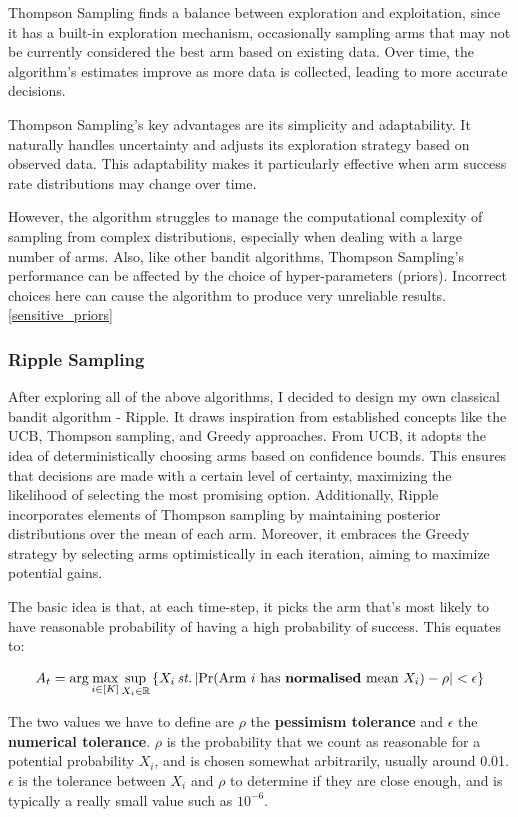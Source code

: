 Thompson Sampling finds a balance between exploration and exploitation, since it has a built-in exploration mechanism, occasionally sampling arms that may not be currently considered the best arm based on existing data. Over time, the algorithm's estimates improve as more data is collected, leading to more accurate decisions.

Thompson Sampling's key advantages are its simplicity and adaptability. It naturally handles uncertainty and adjusts its exploration strategy based on observed data. This adaptability makes it particularly effective when arm success rate distributions may change over time.

However, the algorithm struggles to manage the computational complexity of sampling from complex distributions, especially when dealing with a large number of arms. Also, like other bandit algorithms, Thompson Sampling's performance can be affected by the choice of hyper-parameters (priors). Incorrect choices here can cause the algorithm to produce very unreliable results.\ref{sensitive_priors}


\subsubsection{Ripple Sampling}
\label{sec:ripple}

After exploring all of the above algorithms, I decided to design my own classical bandit algorithm - Ripple. It draws inspiration from established concepts like the UCB, Thompson sampling, and Greedy approaches. From UCB, it adopts the idea of deterministically choosing arms based on confidence bounds. This ensures that decisions are made with a certain level of certainty, maximizing the likelihood of selecting the most promising option. Additionally, Ripple incorporates elements of Thompson sampling by maintaining posterior distributions over the mean of each arm. Moreover, it embraces the Greedy strategy by selecting arms optimistically in each iteration, aiming to maximize potential gains.

The basic idea is that, at each time-step, it picks the arm that's most likely to have reasonable probability of having a high probability of success. This equates to:

$$A_t = \arg\max_{i \in [K]} \sup_{X_i \in \mathbb{R}} \left\{ X_i \,\text{\textit{st.}} \left| \Pr(\text{Arm } i \text{ has } \textbf{normalised} \text{ mean } X_i) - \rho \right| < \epsilon \right\}
$$

The two values we have to define are $\rho$ the \textbf{pessimism tolerance} and $\epsilon$ the \textbf{numerical tolerance}. $\rho$ is the probability that we count as reasonable for a potential probability $X_i$, and is chosen somewhat arbitrarily, usually around 0.01. $\epsilon$ is the tolerance between $X_i$ and $\rho$ to determine if they are close enough, and is typically a really small value such as $10^{-6}$.

